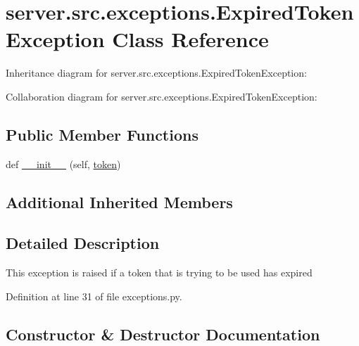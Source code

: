 \hypertarget{classserver_1_1src_1_1exceptions_1_1_expired_token_exception}{}\section{server.\+src.\+exceptions.\+Expired\+Token\+Exception Class Reference}
\label{classserver_1_1src_1_1exceptions_1_1_expired_token_exception}


Inheritance diagram for server.\+src.\+exceptions.\+Expired\+Token\+Exception\+:


Collaboration diagram for server.\+src.\+exceptions.\+Expired\+Token\+Exception\+:
\subsection*{Public Member Functions}
\begin{DoxyCompactItemize}
\item 
def \hyperlink{classserver_1_1src_1_1exceptions_1_1_expired_token_exception_a09f220a07aebdf5a4d64cfe5cd9ffe06}{\+\_\+\+\_\+init\+\_\+\+\_\+} (self, \hyperlink{classserver_1_1src_1_1exceptions_1_1_invalid_token_exception_a55c9f26dd8ec500cd9f49be460f45379}{token})
\end{DoxyCompactItemize}
\subsection*{Additional Inherited Members}


\subsection{Detailed Description}
\begin{DoxyVerb}This exception is raised if a token that is trying to be used has expired\end{DoxyVerb}
 

Definition at line 31 of file exceptions.\+py.



\subsection{Constructor \& Destructor Documentation}
